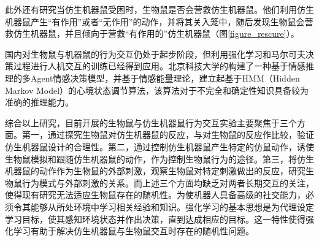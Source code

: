 此外还有\citeauthor{quinnWhenRatsRescue2018}研究当仿生机器鼠受困时，生物鼠是否会营救仿生机器鼠。他们利用仿生机器鼠产生“有作用”或者“无作用”的动作，并将其关入笼中，随后发现生物鼠会营救仿生机器鼠，并且倾向于营救“有作用的”仿生机器鼠（图\ref{figure_rescure}）\cite{quinnWhenRatsRescue2018}。

国内对生物鼠与机器鼠的行为交互仍处于起步阶段，但利用强化学习和马尔可夫决策过程进行人机交互的训练已经得到应用。北京科技大学的\citeauthor{wangJiYuFangRenJiQiRenDeRenJiJiaoHuYuHeZuoYanJiu2015}构建了一种基于情感推理的多Agent情感决策模型，并基于情感能量理论，建立起基于HMM（Hidden Markov Model）的心境状态调节算法，该算法对于不完全和确定性知识具备较为准确的推理能力\cite{wangJiYuFangRenJiQiRenDeRenJiJiaoHuYuHeZuoYanJiu2015}。

综合以上研究，目前开展的生物鼠与仿生机器鼠行为交互实验主要聚焦于三个方面。第一，通过探究生物鼠对仿生机器鼠的反应，与对生物鼠的反应作比较，验证仿生机器鼠设计的合理性。第二，通过控制仿生机器鼠产生特定的仿鼠动作，诱使生物鼠模拟和跟随仿生机器鼠的动作，作为控制生物鼠行为的途径。第三，将仿生机器鼠的动作作为生物鼠的外部刺激，观察生物鼠对特定刺激做出的反应，研究生物鼠行为模式与外部刺激的关系。而上述三个方面均缺乏对两者长期交互的关注，使得现有研究无法适应生物鼠存在的随机性。为使机器人具备高级的社交能力，必须令其能够从所处环境中学习相关经验和知识\cite{bhaumikAIRobotics2018}。强化学习的基本思想是为代理设定学习目标，使其感知环境状态并作出决策，直到达成相应的目标\cite{ISI:000481873900002}。这一特性使得强化学习有助于解决仿生机器鼠与生物鼠交互时存在的随机性问题。